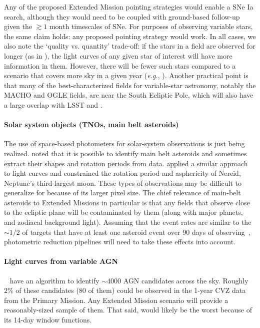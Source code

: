 Any of the proposed Extended Mission pointing strategies would enable a SNe Ia search, although they would need to be coupled with ground-based follow-up given the $\gtrsim 1$ month timescales of SNe.
For purposes of observing variable stars, the same claim holds: any proposed pointing strategy would work.
In all cases, we also note the `quality vs. quantity' trade-off: if the stars in a field are observed for longer (as in \npole), the light curves of any given star of interest will have more information in them.
However, there will be fewer such stars compared to a scenario that covers more sky in a given year (\textit{e.g.}, \nhemi).
Another practical point is that many of the best-characterized fields for variable-star astronomy, notably the MACHO and OGLE fields, are near the South Ecliptic Pole, which will also have a large overlap with LSST and \gaia\!.



\paragraph{Solar system objects (TNOs, main belt asteroids)}
The use of space-based photometers for solar-system observations is just being realized.
\citet{szabo_mainbelt_2015} noted that it is possible to identify main belt asteroids and sometimes extract their shapes and rotation periods from \ktwo data.
\citep{kiss_nereid_2016} applied a similar approach to \ktwo light curves and constrained the rotation period and asphericity of Nereid, Neptune's third-largest moon.
These types of observations may be difficult to generalize for \tess because of its larger pixel size. 
The chief relevance of main-belt asteroids to Extended Missions in particular is that any fields that observe close to the ecliptic plane will be contaminated by them (along with major planets, and zodiacal background light).
Assuming that the event rates are similar to the $\sim\!1/2$ of targets that have at least one asteroid event over 90 days of \ktwo observing~\citep{szabo_mainbelt_2015}, \tesss photometric reduction pipelines will need to take these effects into account.

\paragraph{Light curves from variable AGN}
~\citet{edelson_agn_2013} have an algorithm to identify $\sim$4000 AGN candidates across the sky.
Roughly $2\%$ of these candidates (80 of them) could be observed in the 1-year CVZ data from the Primary Mission.
Any Extended Mission scenario will provide a reasonably-sized sample of them. %
That said, \hemis\:would likely be the worst because of its 14-day window functions.




